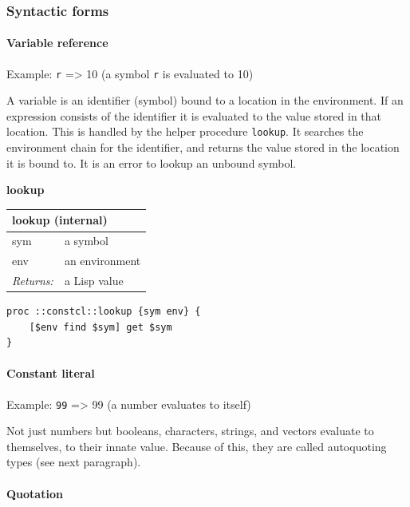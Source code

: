 \documentclass[twoside,9pt]{report}
\begin{document}
\subsubsection{Syntactic forms}
\label{syntactic-forms}
\paragraph{Variable reference}
\label{variable-reference}

Example: \texttt{r} => 10 (a symbol \texttt{r} is evaluated to 10)


A variable is an identifier (symbol) bound to a location in the environment. If an expression consists of the identifier it is evaluated to the value stored in that location. This is handled by the helper procedure \texttt{lookup}. It searches the environment chain for the identifier, and returns the value stored in the location it is bound to. It is an error to lookup an unbound symbol.


\textbf{lookup}

\begin{tabular}{ |l l| }
\hline
\multicolumn{2}{|l|}{lookup (internal)} \\
\hline
sym & a symbol \\
env & an environment \\
\textit{Returns:} & a Lisp value \\
\hline
\end{tabular}

\noindent\makebox[\linewidth]{\rule{\linewidth}{0.4pt}}
\begin{lstlisting}
proc ::constcl::lookup {sym env} {
    [$env find $sym] get $sym
}
\end{lstlisting}
\noindent\makebox[\linewidth]{\rule{\linewidth}{0.4pt}}
\paragraph{Constant literal}
\label{constant-literal}

Example: \texttt{99} => 99 (a number evaluates to itself)


Not just numbers but booleans, characters, strings, and vectors evaluate to themselves, to their innate value. Because of this, they are called autoquoting types (see next paragraph).

\paragraph{Quotation}
\label{quotation}
\end{document}
